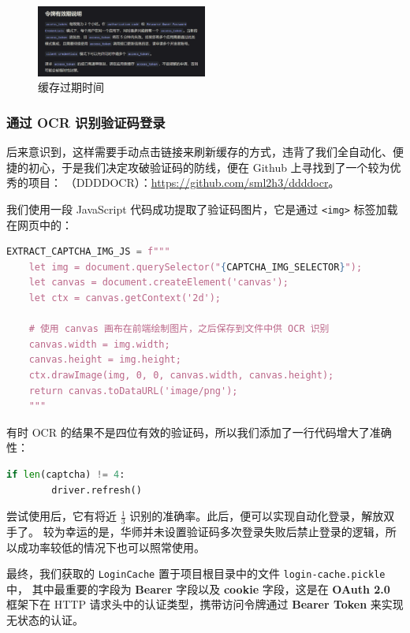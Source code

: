 \begin{figure}[H]
    \centering
    \includegraphics[width=0.5\textwidth]{img/open_platform.png}
    \caption{缓存过期时间}
    \label{fig:cache_expiration}
\end{figure}

\subsubsection{通过 OCR 识别验证码登录}

后来意识到，这样需要手动点击链接来刷新缓存的方式，违背了我们全自动化、便捷的初心，于是我们决定攻破验证码的防线，便在 Github 上寻找到了一个较为优秀的项目：
（DDDDOCR）：\href{https://github.com/sml2h3/ddddocr}{\underline{https://github.com/sml2h3/ddddocr}}。

我们使用一段 JavaScript 代码成功提取了验证码图片，它是通过 \texttt{<img>} 标签加载在网页中的：

\begin{lstlisting}[language=python]
    EXTRACT_CAPTCHA_IMG_JS = f"""
    let img = document.querySelector("{CAPTCHA_IMG_SELECTOR}");
    let canvas = document.createElement('canvas');
    let ctx = canvas.getContext('2d');

    # 使用 canvas 画布在前端绘制图片，之后保存到文件中供 OCR 识别
    canvas.width = img.width;
    canvas.height = img.height;
    ctx.drawImage(img, 0, 0, canvas.width, canvas.height);
    return canvas.toDataURL('image/png');
    """
\end{lstlisting}

有时 OCR 的结果不是四位有效的验证码，所以我们添加了一行代码增大了准确性：

\begin{lstlisting}[language=Python]
    if len(captcha) != 4:
        driver.refresh()
\end{lstlisting}

尝试使用后，它有将近 $\frac{1}{3}$ 识别的准确率。此后，便可以实现自动化登录，解放双手了。
较为幸运的是，华师并未设置验证码多次登录失败后禁止登录的逻辑，所以成功率较低的情况下也可以照常使用。

最终，我们获取的 \texttt{LoginCache} 置于项目根目录中的文件 \texttt{login-cache.pickle} 中，
其中最重要的字段为 \textbf{Bearer} 字段以及 \textbf{cookie} 字段，这是在 \textbf{OAuth 2.0} 框架下在 HTTP 请求头中的认证类型，携带访问令牌通过 \textbf{Bearer Token} 来实现无状态的认证。


